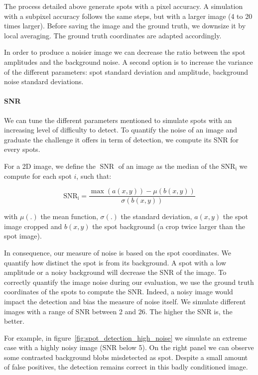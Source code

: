 
The process detailed above generate spots with a pixel accuracy.
A simulation with a subpixel accuracy follows the same steps, but with a larger image (4 to 20 times larger).
Before saving the image and the ground truth, we downsize it by local averaging.
The ground truth coordinates are adapted accordingly.

In order to produce a noisier image we can decrease the ratio between the spot amplitudes and the background noise.
A second option is to increase the variance of the different parameters: spot standard deviation and amplitude, background noise standard deviations.

\paragraph{\ac{SNR}}

We can tune the different parameters mentioned to simulate spots with an increasing level of difficulty to detect.
To quantify the noise of an image and graduate the challenge it offers in term of detection, we compute its \ac{SNR} for every spots.

\noindent
For a 2D image, we define the $\operatorname{SNR}$ of an image as the median of the $\operatorname{SNR_i}$ we compute for each spot $i$, such that:

\begin{equation}
	{\displaystyle \operatorname{SNR_i} = \frac{\max(a(x, y)) - \mu(b(x, y))}{\sigma(b(x, y))}}
\end{equation}

\noindent
with $\mu(.)$ the mean function, $\sigma(.)$ the standard deviation, $a(x, y)$ the spot image cropped and $b(x, y)$ the spot background (a crop twice larger than the spot image).

In consequence, our measure of noise is based on the spot coordinates.
We quantify how distinct the spot is from its background.
A spot with a low amplitude or a noisy background will decrease the \ac{SNR} of the image.
To correctly quantify the image noise during our evaluation, we use the ground truth coordinates of the spots to compute the \ac{SNR}.
Indeed, a noisy image would impact the detection and bias the measure of noise itself.
We simulate different images with a range of \ac{SNR} between 2 and 26.
The higher the \ac{SNR} is, the better.

For example, in figure~\ref{fig:spot_detection_high_noise} we simulate an extreme case with a highly noisy image (\ac{SNR} below 5).
On the right panel we can observe some contrasted background blobs misdetected as spot.
Despite a small amount of false positives, the detection remains correct in this badly conditioned image.


